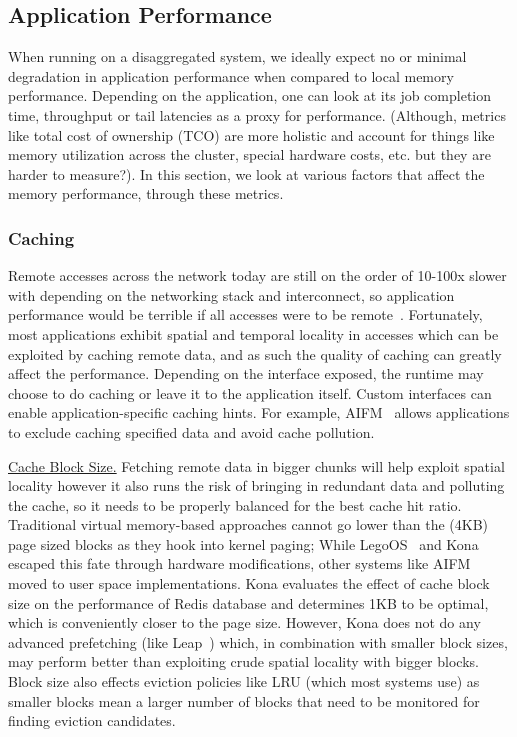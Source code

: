 
\subsection{Application Performance}
\label{sec:performance}
When running on a disaggregated system, we ideally expect 
no or minimal degradation in application performance 
when compared to local memory performance. Depending 
on the application, one can look at its job completion time, 
throughput or tail latencies as a proxy for performance. 
(Although, metrics like total cost of ownership (TCO) are 
more holistic and account for things like memory 
utilization across the cluster, special hardware costs, etc.
but they are harder to measure?). In this section, we 
look at various factors that affect the memory performance,
through these metrics.


\subsubsection{Caching}
Remote accesses across the network today are still on 
the order of 10-100x slower with depending on the 
networking stack and interconnect, so application 
performance would be terrible if all accesses were 
to be remote~\cite{netdisagg}. Fortunately, most 
applications exhibit spatial and temporal locality 
in accesses which can be exploited by caching 
remote data, and as such the quality of caching can 
greatly affect the performance. Depending on the 
interface exposed, the runtime may choose to do 
caching or leave it to the application itself. 
Custom interfaces can enable application-specific 
caching hints. For example, AIFM~\cite{aifm} allows 
applications to exclude caching specified data and 
avoid cache pollution. 

\vspace{3pt}
\noindent \uline{Cache Block Size.} Fetching remote data in 
bigger chunks will help exploit spatial locality 
however it also runs the risk of bringing in redundant data 
and polluting the cache, so it needs to be properly 
balanced for the best cache hit ratio. Traditional
virtual memory-based approaches cannot go lower than 
the (4KB) page sized blocks as they hook into kernel 
paging; While LegoOS~\cite{legoos} and Kona~\cite{kona} 
escaped this fate through hardware modifications, 
other systems like AIFM~\cite{aifm} moved to user 
space implementations. Kona evaluates the effect of 
cache block size on the performance of Redis database 
and determines 1KB to be optimal, which is conveniently 
closer to the page size. However, Kona does not do any 
advanced prefetching (like Leap~\cite{leap}) which, in 
combination with smaller block sizes, may perform better 
than exploiting crude spatial locality with bigger blocks.
Block size also effects eviction policies like LRU (which
most systems use) as smaller blocks mean a larger number 
of blocks that need to be monitored for finding eviction
candidates. 

